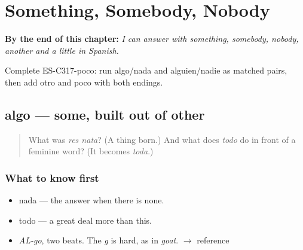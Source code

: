
\chapter{Something, Somebody, Nobody}
\label{ch:algo-y-nadie}

\begin{chapteropening}
\textbf{By the end of this chapter:} \emph{I can answer with something, somebody, nobody, another and a little in Spanish.}

Complete ES-C317-poco: run algo/nada and alguien/nadie as matched pairs, then add otro and poco with both endings.
\end{chapteropening}

\section[algo]{algo — some, built out of other}

\label{lesson:ES-C317-algo}



\begin{quote}
What was \emph{res nata}? (A thing born.) And what does \emph{todo} do in front of a feminine word? (It becomes \emph{toda}.)
\end{quote}

\subsection*{What to know first}
\begin{itemize}
\raggedright
  \item nada — the answer when there is none.
  \item todo — a great deal more than this.
\end{itemize}

\begin{sounds}
\begin{itemize}
\raggedright
  \item \emph{AL-go}, two beats. The \emph{g} is hard, as in \emph{goat}. $\to$ reference
\end{itemize}
\end{sounds}

